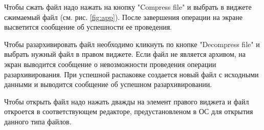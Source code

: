Чтобы сжать файл надо нажать на кнопку "Compress file" и выбрать в виджете сжимаемый файл (см. рис. \ref{fig:app}).
После завершения операции на экране высветится сообщение об успешности ее проведения.



Чтобы разархивировать файл необходимо кликнуть по кнопке "Decompress file" и выбрать нужный файл в правом виджете.
Если файл не является архивом, на экран выводится сообщение о невозможности проведения операции разархивирования.
При успешной распаковке создается новый файл с исходными данными и выводится сообщение об успешном разархивировании.



Чтобы открыть файл надо нажать дважды на элемент правого виджета и файл откроется в соответствующем редакторе, предустановленом в ОС для открытия данного типа файлов.